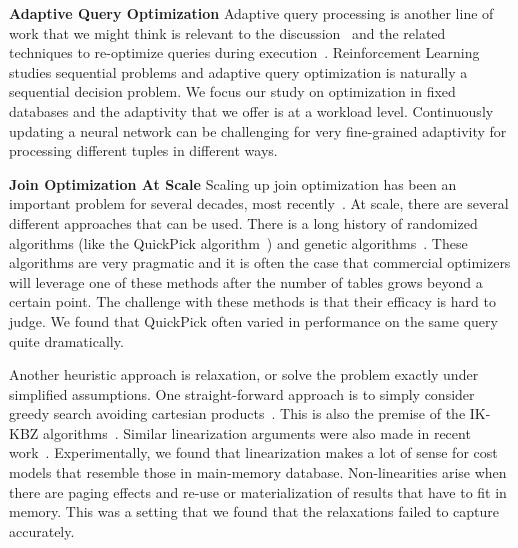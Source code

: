 \vspace{0.5em}\noindent \textbf{Adaptive Query Optimization}
Adaptive query processing is another line of work that we might think is relevant to the discussion~\cite{avnur2000eddies,deshpande2007adaptive} and the related techniques to re-optimize queries during execution~\cite{markl2004robust, babu2005proactive}. Reinforcement Learning studies sequential problems and adaptive query optimization is naturally a sequential decision problem.
We focus our study on optimization in fixed databases and the adaptivity that we offer is at a workload level. Continuously updating a neural network can be challenging for very fine-grained adaptivity for processing different tuples in different ways. 

\vspace{0.5em}\noindent \textbf{Join Optimization At Scale} 
Scaling up join optimization has been an important problem for several decades, most recently~\cite{neumann2018adaptive}. 
At scale, there are several different approaches that can be used.
There is a long history of randomized algorithms (like the QuickPick algorithm~\cite{waas2000join}) and genetic algorithms~\cite{bennett1991genetic, steinbrunn1997heuristic}.
These algorithms are very pragmatic and it is often the case that commercial optimizers will leverage one of these methods after the number of tables grows beyond a certain point.
The challenge with these methods is that their efficacy is hard to judge.
We found that QuickPick often varied in performance on the same query quite dramatically.

Another heuristic approach is relaxation, or solve the problem exactly under simplified assumptions.
One straight-forward approach is to simply consider greedy search avoiding cartesian products~\cite{fegaras1998new}.
This is also the premise of the IK-KBZ algorithms~\cite{ibaraki1984optimal,krishnamurthy1986optimization}.
Similar linearization arguments were also made in recent work~\cite{trummer2017solving,neumann2018adaptive}.
Experimentally, we found that linearization makes a lot of sense for cost models that resemble those in main-memory database.
Non-linearities arise when there are paging effects and re-use or materialization of results that have to fit in memory.
This was a setting that we found that the relaxations failed to capture accurately.













 


